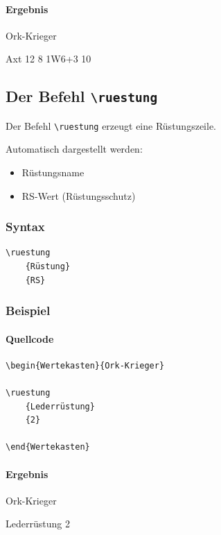 \paragraph{Ergebnis}

\begin{Wertekasten}{Ork-Krieger}

\waffe
    {Axt}
    {12}
    {8}
    {1W6+3}
    {10}

\end{Wertekasten}


\subsection{Der Befehl \texttt{\textbackslash ruestung}}

Der Befehl \verb|\ruestung| erzeugt eine Rüstungszeile.

Automatisch dargestellt werden:

\begin{itemize}
\item Rüstungsname
\item RS-Wert (Rüstungsschutz)
\end{itemize}

\subsubsection*{Syntax}

\begin{Verbatim}
\ruestung
    {Rüstung}
    {RS}
\end{Verbatim}

\subsubsection*{Beispiel}

\paragraph{Quellcode}

\begin{Verbatim}
\begin{Wertekasten}{Ork-Krieger}

\ruestung
    {Lederrüstung}
    {2}

\end{Wertekasten}
\end{Verbatim}

\paragraph{Ergebnis}

\begin{Wertekasten}{Ork-Krieger}

\ruestung
    {Lederrüstung}
    {2}

\end{Wertekasten}
